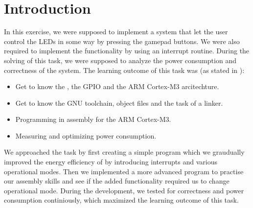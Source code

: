 \section{Introduction}
In this exercise, we were supposed to implement a system that let the user control the LEDs in some way by pressing the gamepad buttons. We were also required to implement the functionality by using an interrupt routine. During the solving of this task, we were supposed to analyze the power consumption and correctness of the system. The learning outcome of this task was (as stated in \cite[p. 19]{compendium}):
\begin{itemize}
	\item Get to know the \boardName, the GPIO and the ARM Cortex-M3 arcitechture.
	\item Get to know the GNU toolchain, object files and the task of a linker.
	\item Programming in assembly for the ARM Cortex-M3.
	\item Measuring and optimizing power consumption.
\end{itemize}
We approached the task by first creating a simple program which we graudually improved the energy efficiency of by introducing interrupts and various operational modes. Then we implemented a more advanced program to practise our assembly skills and see if the added functionality required us to change operational mode. During the development, we tested for correctness and power consumption continiously, which maximized the learning outcome of this task.

